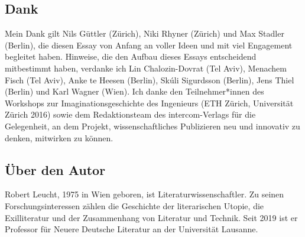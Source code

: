 \documentclass[%
	fontsize=10pt,%
	twoside,%
	headings=optiontoheadandtoc,%
	showtrims]{scrbook}
\newcommand{\antiqua}[3]{%
	\fontsize{#1}{#2}%
	\Lyon%
	\addfontfeature{LetterSpace=#3}%
	\selectfont%
}
\newcommand{\smallfontantiqua}{%
	\normalfont%
	\antiqua{7bp}{8.5bp}{.15}%
}
\newcommand{\smallfontdefault}{%
	\smallfontantiqua%
}
\begin{document}
%
\smallfontdefault%
\raggedcolumns%
\begin{multicols*}{2}%
	\RaggedRight%
	\setlength{\parindent}{\genericindent}%
		\subsection{Dank}%
		\par Mein Dank gilt Nils Güttler (Zürich), Niki Rhyner (Zürich) und Max Stadler (Berlin), die diesen Essay von Anfang an voller Ideen und mit viel Engagement begleitet haben. Hinweise, die den Aufbau dieses Essays entscheidend mitbestimmt haben, verdanke ich Lin Chalozin-Dovrat (Tel Aviv), Menachem Fisch (Tel Aviv), Anke te Heesen (Berlin), Skúli Sigurdsson (Berlin), Jens Thiel (Berlin) und Karl Wagner (Wien). Ich danke den Teilnehmer*innen des Workshops zur Imaginationsgeschichte des Ingenieurs (ETH Zürich, Universität Zürich 2016) sowie dem Redaktionsteam des intercom-Verlags für die Gelegenheit, an dem Projekt, wissenschaftliches Publizieren neu und innovativ zu denken, mitwirken zu können.%
		\vfill%
		\null%
		\columnbreak
			\subsection*{Über den Autor}%
		\par Robert Leucht, 1975 in Wien geboren, ist Literaturwissenschaftler. Zu seinen Forschungsinteressen zählen die Geschichte der literarischen Utopie, die Exilliteratur und der Zusammenhang von Literatur und Technik. Seit 2019 ist er Professor für Neuere Deutsche Literatur an der Universität Lausanne.%
\end{multicols*}%
\end{document}
